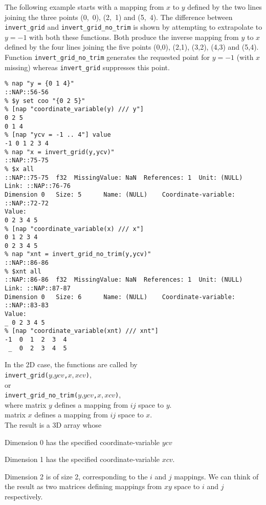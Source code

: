 The following example starts with a mapping from 
  $x$ to 
  $y$ defined by the two lines joining the three points
  (0,\ 0), (2,\ 1) and (5,\ 4). The difference between 
  \texttt{invert\_grid} and 
  \texttt{invert\_grid\_no\_trim} is shown by attempting to
  extrapolate to $y=-1$ with both these functions.
Both produce the inverse mapping from $y$ to 
  $x$ defined by the four lines joining the five points
  (0,0), (2,1), (3,2), (4,3) and (5,4).
Function \texttt{invert\_grid\_no\_trim} generates the requested point for $y=-1$ (with 
$x$ missing) whereas \texttt{invert\_grid} suppresses this point.
  \begin{verbatim}
% nap "y = {0 1 4}"
::NAP::56-56
% $y set coo "{0 2 5}"
% [nap "coordinate_variable(y) /// y"]
0 2 5
0 1 4
% [nap "ycv = -1 .. 4"] value
-1 0 1 2 3 4
% nap "x = invert_grid(y,ycv)"
::NAP::75-75
% $x all
::NAP::75-75  f32  MissingValue: NaN  References: 1  Unit: (NULL)
Link: ::NAP::76-76
Dimension 0   Size: 5      Name: (NULL)    Coordinate-variable: ::NAP::72-72
Value:
0 2 3 4 5
% [nap "coordinate_variable(x) /// x"]
0 1 2 3 4
0 2 3 4 5
% nap "xnt = invert_grid_no_trim(y,ycv)"
::NAP::86-86
% $xnt all
::NAP::86-86  f32  MissingValue: NaN  References: 1  Unit: (NULL)
Link: ::NAP::87-87
Dimension 0   Size: 6      Name: (NULL)    Coordinate-variable: ::NAP::83-83
Value:
_ 0 2 3 4 5
% [nap "coordinate_variable(xnt) /// xnt"]
-1  0  1  2  3  4
 _  0  2  3  4  5
\end{verbatim}

In the 2D case, the functions are called by
\\
\texttt{invert\_grid(}$y\texttt{,}ycv$\texttt{,}$x,xcv$\texttt{)},
\\or
\\
\texttt{invert\_grid\_no\_trim(}$y\texttt{,}ycv$\texttt{,}$x,xcv$\texttt{)},
  \\where matrix 
  $y$ defines a mapping from 
  $ij$ space to 
  $y$.
  \\matrix 
  $x$ defines a mapping from 
  $ij$ space to 
  $x$.
  \\The result is a 3D array whose
  \begin{bullets}
    \item Dimension 0 has the specified coordinate-variable $ycv$
    \item Dimension 1 has the specified coordinate-variable $xcv$.
    \item Dimension 2 is of size 2, corresponding to the $i$ and $j$ mappings.
	We can think of the result as two matrices defining mappings from $xy$ space to 
	$i$ and $j$ respectively.
  \end{bullets}

